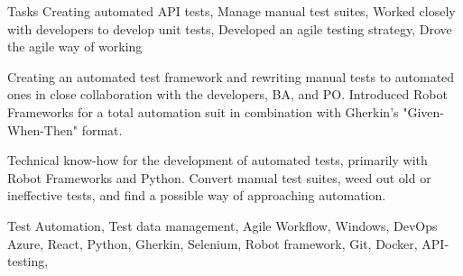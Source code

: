\documentclass{sobCV}[2015/09/08]
\begin{document}
   {Tasks}{
       Creating automated API tests, 
       Manage manual test suites,
       Worked closely with developers to develop unit tests,
       Developed an agile testing strategy,
       Drove the agile way of working 
 }{  %
      {

         Creating an automated test framework and rewriting manual tests to
         automated ones in close collaboration with the developers, BA, and
         PO. Introduced Robot Frameworks for a total automation suit in
         combination with Gherkin's "Given-When-Then" format. 

         Technical know-how for the development of automated tests, primarily
         with Robot Frameworks and Python. Convert manual test suites, weed
         out old or ineffective tests, and find a possible way of
         approaching automation. 

     }
 }{
       Test Automation,
       Test data management,
       Agile Workflow, 
       Windows, 
       DevOps Azure, 
       React, 
       Python, 
       Gherkin, 
       Selenium, 
       Robot framework,
       Git, 
       Docker, 
       API-testing, 

}
\end{document}
